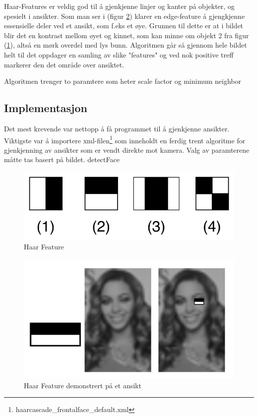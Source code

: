 Haar-Features er veldig god til å gjenkjenne linjer og kanter på objekter, og spesielt i ansikter. Som man ser i (figur \ref{fig:haarface}) klarer en edge-feature å gjengkjenne essensielle deler ved et ansikt, som f.eks et øye. Grunnen til dette er at i bildet blir det en kontrast mellom øyet og kinnet, som kan minne om objekt 2 fra figur (\ref{fig:haarfeat}), altså en mørk overdel med lys bunn. Algoritmen går så gjennom hele bildet helt til det oppdager en samling av slike "features" og ved nok positive treff markerer den det område over ansiktet.

Algoritmen trenger to paramtere som heter scale factor og minimum neighbor

\subsection{Implementasjon}
Det mest krevende var nettopp å få programmet til å gjenkjenne ansikter. Viktigste var å importere xml-filen\footnote{haarcascade\_frontalface\_default.xml\cite{xml:haar}} som inneholdt en ferdig trent algoritme for gjenkjenning av ansikter som er vendt direkte mot kamera. Valg av paramterene måtte tas basert på bildet.
{detectFace}

\begin{figure}
\begin{center}
    \includegraphics[width=0.4\columnwidth]{bilder/Anonymisering/VJ_featureTypes.svg.png}
     \caption{Haar Feature\label{fig:haarfeat}} 
\end{center}
\end{figure}

\begin{figure}
\begin{center}
    \includegraphics[width=0.5\columnwidth]{bilder/Anonymisering/haarface-example.png}
     \caption{Haar Feature demonstrert på et ansikt \label{fig:haarface}} 
\end{center}
\end{figure}

